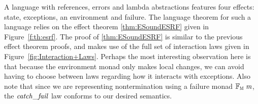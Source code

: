 A language with references, errors and lambda abstractions features
four effects: state, exceptions, an environment and failure. The
language theorem for such a language relies on the effect theorem
\ref{thm:ESoundESRF} given in Figure~\ref{f:th:esrf}. The proof of
\ref{thm:ESoundESRF} is similar to the previous effect theorem proofs, and
makes use of the full set of interaction laws given in
Figure~\ref{fig:Interaction+Laws}. Perhaps the most interesting
observation here is that because the environment monad only makes
local changes, we can avoid having to choose between laws regarding
how it interacts with exceptions. Also note that since we are
representing nontermination using a failure monad \ensuremath{\mathbb{F}_{\scalebox{0.6}{M}}\;\Varid{m}}, the
\ensuremath{\Varid{catch\char95 fail}} law conforms to our desired semantics.

